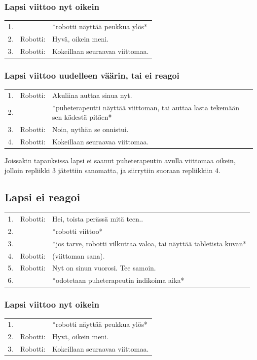 \subsubsection{Lapsi viittoo nyt oikein}
\begin{tabular}{llp{10cm}}
 1. &  & *robotti näyttää peukkua ylös* \\
 2. & Robotti: & Hyvä, oikein meni.\\
 3. & Robotti: & Kokeillaan seuraavaa viittomaa.  \\
\end{tabular}

\subsubsection{Lapsi viittoo uudelleen väärin, tai ei reagoi}
\begin{tabular}{llp{10cm}}
 1. & Robotti: & Akuliina auttaa sinua nyt.\\
 2. & & *puheterapeutti näyttää viittoman, tai auttaa lasta tekemään sen kädestä pitäen* \\
 3. & Robotti: & Noin, nythän se onnistui.\\
 4. & Robotti: & Kokeillaan seuraavaa viittomaa.  \\
\end{tabular} \hfill\break

Joissakin tapauksissa lapsi ei saanut puheterapeutin avulla viittomaa oikein, jolloin repliikki 3 jätettiin sanomatta, ja siirrytiin suoraan repliikkiin 4.


\subsection{Lapsi ei reagoi}
\begin{tabular}{llp{10cm}}
 1. & Robotti: & Hei, toista perässä mitä teen.. \\
 2. & & *robotti viittoo* \\
 3. & & *jos tarve, robotti vilkuttaa valoa, tai näyttää tabletista kuvan* \\
 4. & Robotti: & (viittoman sana). \\
 5. & Robotti: & Nyt on sinun vuorosi. Tee samoin. \\
 6. & & *odotetaan puheterapeutin indikoima aika* \\
\end{tabular}

\subsubsection{Lapsi viittoo nyt oikein}
\begin{tabular}{llp{10cm}}
 1. &  & *robotti näyttää peukkua ylös* \\
 2. & Robotti: & Hyvä, oikein meni.\\
 3. & Robotti: & Kokeillaan seuraavaa viittomaa.  \\
\end{tabular}

